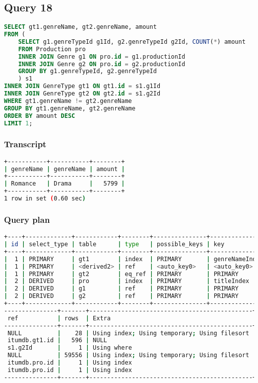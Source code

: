 \bigskip
\subsection{Query 18}
\begin{lstlisting}[language=sql]
SELECT gt1.genreName, gt2.genreName, amount
FROM (
	SELECT g1.genreTypeId g1Id, g2.genreTypeId g2Id, COUNT(*) amount
	FROM Production pro
	INNER JOIN Genre g1 ON pro.id = g1.productionId
	INNER JOIN Genre g2 ON pro.id = g2.productionId
	GROUP BY g1.genreTypeId, g2.genreTypeId
	) s1
INNER JOIN GenreType gt1 ON gt1.id = s1.g1Id
INNER JOIN GenreType gt2 ON gt2.id = s1.g2Id
WHERE gt1.genreName != gt2.genreName
GROUP BY gt1.genreName, gt2.genreName
ORDER BY amount DESC
LIMIT 1;
\end{lstlisting}

\subsubsection{Transcript}
\begin{lstlisting}[language=bash]
+-----------+-----------+--------+
| genreName | genreName | amount |
+-----------+-----------+--------+
| Romance   | Drama     |   5799 |
+-----------+-----------+--------+
1 row in set (0.60 sec)
\end{lstlisting}

\subsubsection{Query plan}
\begin{lstlisting}[language=bash]
+----+-------------+------------+--------+---------------+----------------+---------+
| id | select_type | table      | type   | possible_keys | key            | key_len |
+----+-------------+------------+--------+---------------+----------------+---------+
|  1 | PRIMARY     | gt1        | index  | PRIMARY       | genreNameIndex | 77      |
|  1 | PRIMARY     | <derived2> | ref    | <auto_key0>   | <auto_key0>    | 4       |
|  1 | PRIMARY     | gt2        | eq_ref | PRIMARY       | PRIMARY        | 4       |
|  2 | DERIVED     | pro        | index  | PRIMARY       | titleIndex     | 32      |
|  2 | DERIVED     | g1         | ref    | PRIMARY       | PRIMARY        | 4       |
|  2 | DERIVED     | g2         | ref    | PRIMARY       | PRIMARY        | 4       |
+----+-------------+------------+--------+---------------+----------------+---------+
---------------+-------+----------------------------------------------+
 ref           | rows  | Extra                                        |
---------------+-------+----------------------------------------------+
 NULL          |    28 | Using index; Using temporary; Using filesort |
 itumdb.gt1.id |   596 | NULL                                         |
 s1.g2Id       |     1 | Using where                                  |
 NULL          | 59556 | Using index; Using temporary; Using filesort |
 itumdb.pro.id |     1 | Using index                                  |
 itumdb.pro.id |     1 | Using index                                  |
---------------+-------+----------------------------------------------+
\end{lstlisting}

